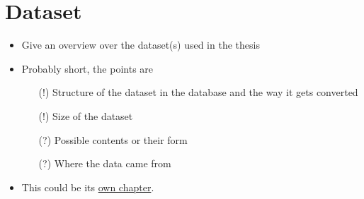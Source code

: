 \section{Dataset}
\begin{itemize}
  \item Give an overview over the dataset(s) used in the thesis %
  \item Probably short, the points are
        \begin{itemize}
          \item[(!)] Structure of the dataset in the database and the way it gets converted
          \item[(!)] Size of the dataset
          \item[(?)] Possible contents or their form
          \item[(?)] Where the data came from
        \end{itemize}
  \item This could be its \underline{own chapter}.
\end{itemize}